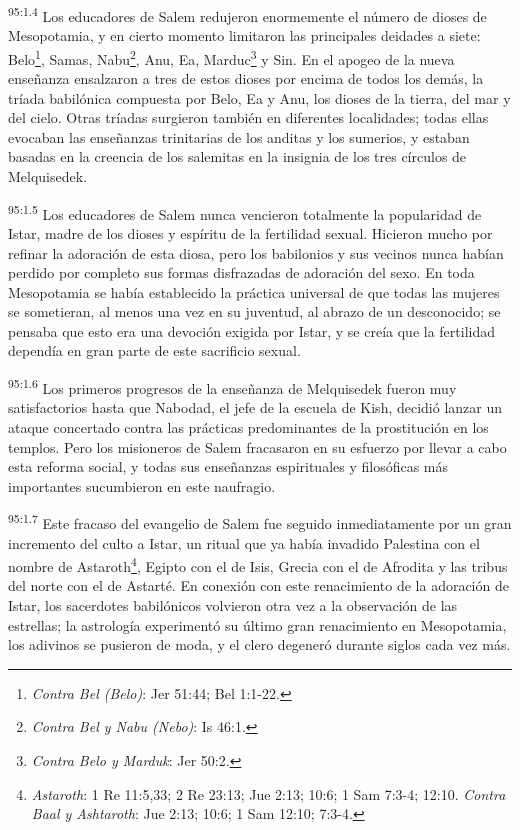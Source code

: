 \par
\textsuperscript{95:1.4} Los educadores de Salem redujeron enormemente el número de dioses de Mesopotamia, y en cierto momento limitaron las principales deidades a siete: Belo\footnote{\textit{Contra Bel (Belo)}: Jer 51:44; Bel 1:1-22.}, Samas, Nabu\footnote{\textit{Contra Bel y Nabu (Nebo)}: Is 46:1.}, Anu, Ea, Marduc\footnote{\textit{Contra Belo y Marduk}: Jer 50:2.} y Sin. En el apogeo de la nueva enseñanza ensalzaron a tres de estos dioses por encima de todos los demás, la tríada babilónica compuesta por Belo, Ea y Anu, los dioses de la tierra, del mar y del cielo. Otras tríadas surgieron también en diferentes localidades; todas ellas evocaban las enseñanzas trinitarias de los anditas y los sumerios, y estaban basadas en la creencia de los salemitas en la insignia de los tres círculos de Melquisedek.

\par
\textsuperscript{95:1.5} Los educadores de Salem nunca vencieron totalmente la popularidad de Istar, madre de los dioses y espíritu de la fertilidad sexual. Hicieron mucho por refinar la adoración de esta diosa, pero los babilonios y sus vecinos nunca habían perdido por completo sus formas disfrazadas de adoración del sexo. En toda Mesopotamia se había establecido la práctica universal de que todas las mujeres se sometieran, al menos una vez en su juventud, al abrazo de un desconocido; se pensaba que esto era una devoción exigida por Istar, y se creía que la fertilidad dependía en gran parte de este sacrificio sexual.

\par
\textsuperscript{95:1.6} Los primeros progresos de la enseñanza de Melquisedek fueron muy satisfactorios hasta que Nabodad, el jefe de la escuela de Kish, decidió lanzar un ataque concertado contra las prácticas predominantes de la prostitución en los templos. Pero los misioneros de Salem fracasaron en su esfuerzo por llevar a cabo esta reforma social, y todas sus enseñanzas espirituales y filosóficas más importantes sucumbieron en este naufragio.

\par
\textsuperscript{95:1.7} Este fracaso del evangelio de Salem fue seguido inmediatamente por un gran incremento del culto a Istar, un ritual que ya había invadido Palestina con el nombre de Astaroth\footnote{\textit{Astaroth}: 1 Re 11:5,33; 2 Re 23:13; Jue 2:13; 10:6; 1 Sam 7:3-4; 12:10. \textit{Contra Baal y Ashtaroth}: Jue 2:13; 10:6; 1 Sam 12:10; 7:3-4.}, Egipto con el de Isis, Grecia con el de Afrodita y las tribus del norte con el de Astarté. En conexión con este renacimiento de la adoración de Istar, los sacerdotes babilónicos volvieron otra vez a la observación de las estrellas; la astrología experimentó su último gran renacimiento en Mesopotamia, los adivinos se pusieron de moda, y el clero degeneró durante siglos cada vez más.

